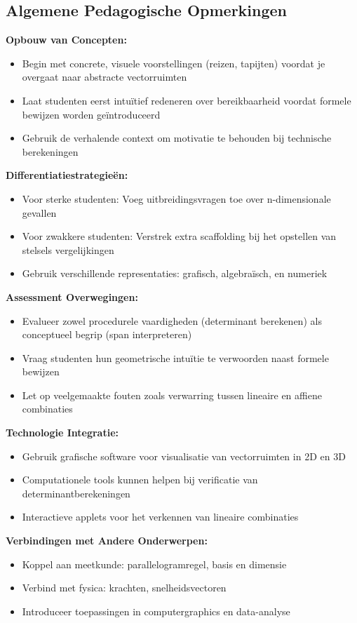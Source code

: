 \documentclass{ximera}
\begin{document}
\subsection*{Algemene Pedagogische Opmerkingen}

\textbf{Opbouw van Concepten:}
\begin{itemize}
\item Begin met concrete, visuele voorstellingen (reizen, tapijten) voordat je overgaat naar abstracte vectorruimten
\item Laat studenten eerst intuïtief redeneren over bereikbaarheid voordat formele bewijzen worden geïntroduceerd
\item Gebruik de verhalende context om motivatie te behouden bij technische berekeningen
\end{itemize}

\textbf{Differentiatiestrategieën:}
\begin{itemize}
\item Voor sterke studenten: Voeg uitbreidingsvragen toe over n-dimensionale gevallen
\item Voor zwakkere studenten: Verstrek extra scaffolding bij het opstellen van stelsels vergelijkingen
\item Gebruik verschillende representaties: grafisch, algebraïsch, en numeriek
\end{itemize}

\textbf{Assessment Overwegingen:}
\begin{itemize}
\item Evalueer zowel procedurele vaardigheden (determinant berekenen) als conceptueel begrip (span interpreteren)
\item Vraag studenten hun geometrische intuïtie te verwoorden naast formele bewijzen
\item Let op veelgemaakte fouten zoals verwarring tussen lineaire en affiene combinaties
\end{itemize}

\textbf{Technologie Integratie:}
\begin{itemize}
\item Gebruik grafische software voor visualisatie van vectorruimten in 2D en 3D
\item Computationele tools kunnen helpen bij verificatie van determinantberekeningen
\item Interactieve applets voor het verkennen van lineaire combinaties
\end{itemize}

\textbf{Verbindingen met Andere Onderwerpen:}
\begin{itemize}
\item Koppel aan meetkunde: parallelogramregel, basis en dimensie
\item Verbind met fysica: krachten, snelheidsvectoren
\item Introduceer toepassingen in computergraphics en data-analyse
\end{itemize}
\end{document}
